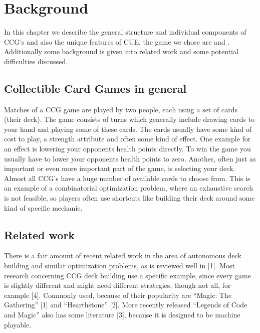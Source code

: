 \chapter{Background}
\label{ch:background}
In this chapter we describe the general structure and individual components of \ac{CCG}'s and also the unique features of \ac{CUE}, the game we chose are and . Additionally some background is given into related work and some potential difficulties discussed.

\section{Collectible Card Games in general}
\label{sec:background:ccg}
Matches of a \ac{CCG} game are played by two people, each using a set of cards (their deck). The game consists of turns which generally include drawing cards to your hand and playing some of these cards. The cards usually have some kind of cost to play, a strength attribute and often some kind of effect. One example for an effect is lowering your opponents health points directly. To win the game you usually have to lower your opponents health points to zero. 
Another, often just as important or even more important part of the game, is selecting your deck. Almost all \ac{CCG}’s have a huge number of available cards to choose from. This is an example of a combinatorial optimization problem, where an exhaustive search is not feasible, so players often use shortcuts like building their deck around some kind of specific mechanic.

\section{Related work}
\label{sec:background:related}
There is a fair amount of recent related work in the area of autonomous deck building and similar optimization problems, as is reviewed well in [1]. Most research concerning CCG deck building use a specific example, since every game is slightly different and might need different strategies, though not all, for example [4]. Commonly used, because of their popularity are “Magic: The Gathering” [1] and “Hearthstone” [2]. More recently released “Legends of Code and Magic” also has some literature [3], because it is designed to be machine playable.

